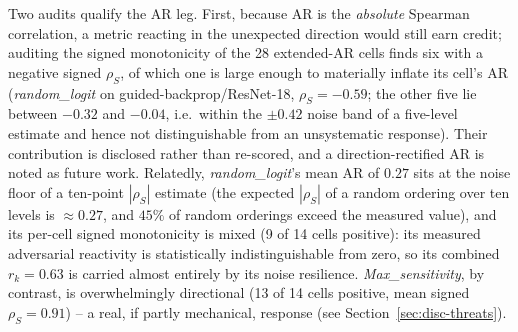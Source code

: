 Two audits qualify the AR leg. First, because AR is the \emph{absolute}
Spearman correlation, a metric reacting in the unexpected direction would
still earn credit; auditing the signed monotonicity of the 28 extended-AR
cells finds six with a negative signed $\rho_S$, of which one is large
enough to materially inflate its cell's AR
(\emph{random\_logit} on guided-backprop/ResNet-18, $\rho_S = -0.59$; the
other five lie between $-0.32$ and $-0.04$, i.e.\ within the
$\pm0.42$ noise band of a five-level estimate and hence not distinguishable
from an unsystematic response). Their contribution is
disclosed rather than re-scored, and a direction-rectified AR is noted as
future work. Relatedly, \emph{random\_logit}'s mean AR of $0.27$ sits at
the noise floor of a ten-point $|\rho_S|$ estimate (the expected
$|\rho_S|$ of a random ordering over ten levels is ${\approx}0.27$, and
$45\%$ of random orderings exceed the measured value), and its per-cell
signed monotonicity is mixed (9 of 14 cells positive): its measured
adversarial reactivity is statistically indistinguishable from zero, so
its combined $r_k = 0.63$ is carried almost entirely by its
noise resilience.
\emph{Max\_sensitivity}, by contrast, is overwhelmingly directional (13 of
14 cells positive, mean signed $\rho_S = 0.91$) -- a real, if partly
mechanical, response (see Section~\ref{sec:disc-threats}).

